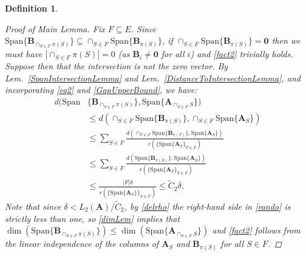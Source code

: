 \documentclass[9pt,twocolumn]{pnas-new}
\newtheorem{definition}{Definition}
\begin{document}
\begin{definition}
\begin{proof}[Proof of Main Lemma]
Fix $F \subseteq E$. Since $\text{Span}\{\mathbf{B}_{\cap_{S \in F}\pi(S)}\} \subseteq \cap_{S \in F} \text{Span}\{\mathbf{B}_{\pi(S)}\}$, if $\cap_{S \in F} \text{Span}\{\mathbf{B}_{\pi(S)}\} = \textbf{0}$ then we must have $|\cap_{S \in F} \pi(S)| = 0$ (as $\mathbf{B}_i \neq \textbf{0}$ for all $i$) and \eqref{fact2} trivially holds. Suppose then that the intersection is not the zero vector. By Lem.~\ref{SpanIntersectionLemma} and Lem.~\ref{DistanceToIntersectionLemma}, and incorporating \eqref{eq2} and \eqref{GapUpperBound}, we have:
\begin{align}\label{randoml}
d( \text{Span}&\{\mathbf{B}_{\cap_{S \in F}\pi(S)}\}, \text{Span}\{\mathbf{A}_{\cap_{S \in F} S}\}  ) \nonumber \\
&\leq d\left( \cap_{S \in F} \text{Span}\{\mathbf{B}_{\pi(S)}\}, \cap_{S \in F} \text{Span}\{\mathbf{A}_{S}\} \right) \nonumber \\
&\leq \sum_{S \in F} \frac{ d\left( \cap_{T \in F} \text{Span}\{\mathbf{B}_{\pi(T)}\},\text{Span}\{\mathbf{A}_{S}\} \right) }{ r( \{ \text{Span}\{\mathbf{A}_{T}\}_{T \in F}) } \nonumber \\
&\leq \sum_{S \in F} \frac{ d\left( \text{Span}\{\mathbf{B}_{\pi(S)}\},\text{Span}\{\mathbf{A}_{S}\} \right) }{ r( \{ \text{Span}\{\mathbf{A}_{T}\}_{T \in F}) }\nonumber \\
&\leq \frac{|F| \delta}{r( \{ \text{Span}\{\mathbf{A}_{S}\} \}_{S \in F})} 
\leq \tilde C_2 \delta, 
\end{align}
%
Note that since $\delta < L_2(\mathbf{A}) / \tilde C_2$, by \eqref{delrho} the right-hand side in \eqref{rando} is strictly less than one, so \eqref{dimLem} implies that $\dim(\text{Span}\{\mathbf{B}_{\cap_{S \in F}\pi(S)}\}) \leq \dim(\text{Span}\{\mathbf{A}_{\cap_{S \in F} S}\})$ and \eqref{fact2} follows from the linear independence of the columns of $\mathbf{A}_{S}$ and $\mathbf{B}_{\pi(S)}$ for all $S \in F$.


\end{proof}
\end{definition}
\end{document}
